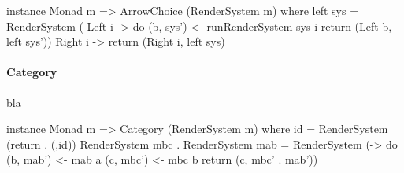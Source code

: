\begin{haskell}[label={lst:rendersystem-arrowchoice},caption={ArrowChoice Instanz für RenderSystem}]
instance Monad m => ArrowChoice (RenderSystem m) where
  left sys = RenderSystem (\case
    Left i  -> do
      (b, sys') <- runRenderSystem sys i
      return (Left b, left sys'))
    Right i -> return (Right i, left sys)
\end{haskell}

\paragraph{Category}
bla

\begin{haskell}[label={lst:rendersystem-category},caption={Category Instanz für RenderSystem}]
instance Monad m => Category (RenderSystem m) where
  id = RenderSystem (return . (,id))
  RenderSystem mbc . RenderSystem mab = RenderSystem (\a -> do
    (b, mab') <- mab a
    (c, mbc') <- mbc b
    return (c, mbc' . mab'))
\end{haskell}
